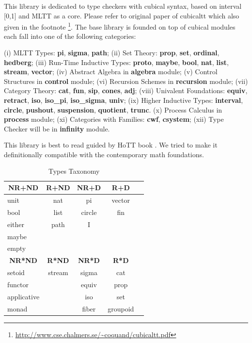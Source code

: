 \documentclass{article}
\newcommand*{\thead}[1]{\multicolumn{1}{c}{\bfseries #1}}
\begin{document}
\newpage

This library is dedicated to type checkers with cubical syntax,
based on interval [0,1] and MLTT as a core.
Please refer to original paper of cubicaltt \cite{Mortberg17}
which also given in the footnote \footnote{\url{http://www.cse.chalmers.se/~coquand/cubicaltt.pdf}}.
The base library is founded on top of cubical modules each
fall into one of the following categories:

(i) MLTT Types: {\bf pi}, {\bf sigma}, {\bf path};
(ii) Set Theory: {\bf prop}, {\bf set}, {\bf ordinal}, {\bf hedberg};
(iii) Run-Time Inductive Types: {\bf proto}, {\bf maybe}, {\bf bool}, {\bf nat}, {\bf list}, {\bf stream}, {\bf vector};
(iv) Abstract Algebra in {\bf algebra} module;
(v) Control Structures in {\bf control} module;
(vi) Recursion Schemes in {\bf recursion} module;
(vii) Category Theory: {\bf cat}, {\bf fun}, {\bf sip}, {\bf cones}, {\bf adj};
(viii) Univalent Foundations: {\bf equiv}, {\bf retract}, {\bf iso}, {\bf iso\_pi}, {\bf iso\_sigma}, {\bf univ};
(ix) Higher Inductive Types: {\bf interval}, {\bf circle}, {\bf pushout}, {\bf suspension}, {\bf quotient}, {\bf trunc}.
(x) Process Calculus in {\bf process} module;
(xi) Categories with Families: {\bf cwf}, {\bf csystem};
(xii) Type Checker will be in {\bf infinity} module.

This library is best to read guided by HoTT book \cite{HoTT}.
We tried to make it definitionally compatible with
the contemporary math foundations.

\begin{table}[h]
\centering
\caption{Types Taxonomy}
\label{tab:a}
\begin{tabular}{lcccc}
\hline
\thead{NR+ND} & \thead{R+ND} & \thead{NR+D} & \thead{R+D}\\
\hline
unit        & nat    & pi      & vector \\
bool        & list   & circle  & fin \\
either      & path   & I       &  \\
maybe       &        &         &  \\
empty       &        &         &  \\
\hline
\thead{NR*ND} & \thead{R*ND} & \thead{NR*D} & \thead{R*D}\\
\hline
setoid      & stream & sigma   & cat  \\
functor     &        & equiv   & prop \\
applicative &        & iso     & set  \\
monad       &        & fiber   & groupoid \\
\end{tabular}
\end{table}
\end{document}
